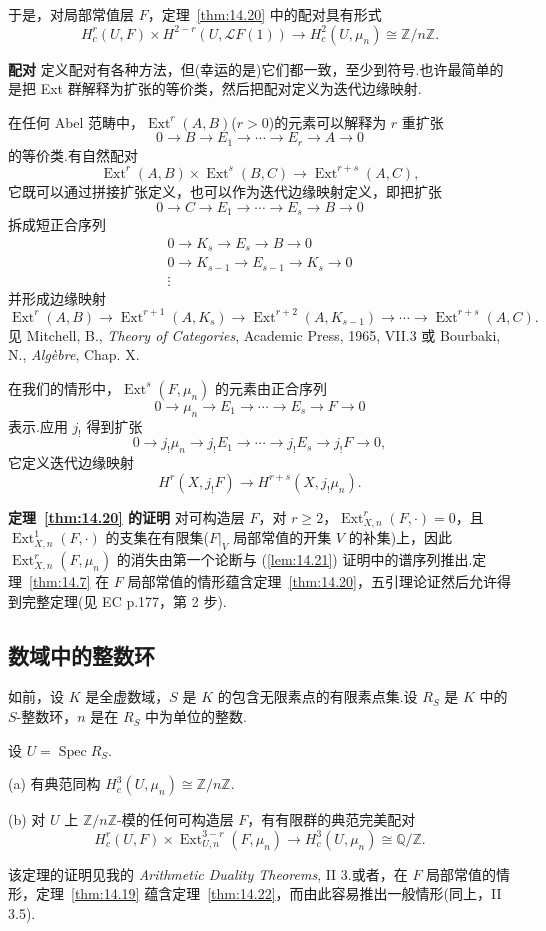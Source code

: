 于是，对局部常值层 $F$，定理~\ref{thm:14.20} 中的配对具有形式
\[
H^{r}_{c}(U, F) \times H^{2-r}(U, \mathcal{L}F(1)) \to H^{2}_{c}(U, \mu_n) \cong \mathbb{Z}/n\mathbb{Z}.
\]

\textbf{配对} 定义配对有各种方法，但(幸运的是)它们都一致，至少到符号.也许最简单的是把 Ext 群解释为扩张的等价类，然后把配对定义为迭代边缘映射.

在任何 Abel 范畴中，$\operatorname{Ext}^{r}(A, B)$($r > 0$)的元素可以解释为 $r$ 重扩张
\[
0 \to B \to E_1 \to \cdots \to E_r \to A \to 0
\]
的等价类.有自然配对
\[
\operatorname{Ext}^{r}(A, B) \times \operatorname{Ext}^{s}(B, C) \to \operatorname{Ext}^{r+s}(A, C),
\]
它既可以通过拼接扩张定义，也可以作为迭代边缘映射定义，即把扩张
\[
0 \to C \to E_1 \to \cdots \to E_s \to B \to 0
\]
拆成短正合序列
\[
\begin{array}{c}
0 \to K_s \to E_s \to B \to 0\\
0 \to K_{s-1} \to E_{s-1} \to K_s \to 0\\
\vdots
\end{array}
\]
并形成边缘映射
\[
\operatorname{Ext}^{r}(A, B) \to \operatorname{Ext}^{r+1}(A, K_s) \to \operatorname{Ext}^{r+2}(A, K_{s-1}) \to \cdots \to \operatorname{Ext}^{r+s}(A, C).
\]
见 Mitchell, B., \emph{Theory of Categories}, Academic Press, 1965, VII.3 或 Bourbaki, N., \emph{Alg\`ebre}, Chap. X.

在我们的情形中，$\operatorname{Ext}^{s}(F, \mu_n)$ 的元素由正合序列
\[
0 \to \mu_n \to E_1 \to \cdots \to E_s \to F \to 0
\]
表示.应用 $j_{!}$ 得到扩张
\[
0 \to j_{!}\mu_n \to j_{!}E_1 \to \cdots \to j_{!}E_s \to j_{!}F \to 0,
\]
它定义迭代边缘映射
\[
H^{r}(X, j_{!}F) \to H^{r+s}(X, j_{!}\mu_n).
\]

\textbf{定理~\ref{thm:14.20} 的证明} 对可构造层 $F$，对 $r \geq 2$，$\operatorname{Ext}^{r}_{X, n}(F, \cdot) = 0$，且 $\operatorname{Ext}^{1}_{X, n}(F, \cdot)$ 的支集在有限集($F|_{V}$ 局部常值的开集 $V$ 的补集)上，因此 $\operatorname{Ext}^{r}_{X, n}(F, \mu_n)$ 的消失由第一个论断与 (\ref{lem:14.21}) 证明中的谱序列推出.定理~\ref{thm:14.7} 在 $F$ 局部常值的情形蕴含定理~\ref{thm:14.20}，五引理论证然后允许得到完整定理(见 EC p.177，第 2 步).

\subsection*{数域中的整数环}

如前，设 $K$ 是全虚数域，$S$ 是 $K$ 的包含无限素点的有限素点集.设 $R_S$ 是 $K$ 中的 $S$-整数环，$n$ 是在 $R_S$ 中为单位的整数.

\begin{theorem}\label{thm:14.22}
设 $U = \operatorname{Spec} R_S$.

(a) 有典范同构 $H^{3}_{c}(U, \mu_n) \cong \mathbb{Z}/n\mathbb{Z}$.

(b) 对 $U$ 上 $\mathbb{Z}/n\mathbb{Z}$-模的任何可构造层 $F$，有有限群的典范完美配对
\[
H^{r}_{c}(U, F) \times \operatorname{Ext}^{3-r}_{U, n}(F, \mu_n) \to H^{3}_{c}(U, \mu_n) \cong \mathbb{Q}/\mathbb{Z}.
\]
\end{theorem}

该定理的证明见我的 \emph{Arithmetic Duality Theorems}, II 3.或者，在 $F$ 局部常值的情形，定理~\ref{thm:14.19} 蕴含定理~\ref{thm:14.22}，而由此容易推出一般情形(同上，II 3.5).
